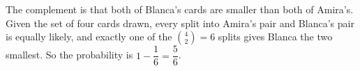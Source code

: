 The complement is that both of Blanca's cards are smaller than both of Amira's. Given the set of four cards drawn, every split into Amira's pair and Blanca's pair is equally likely, and exactly one of the $\binom42=6$ splits gives Blanca the two smallest. So the probability is $1-\dfrac16=\boxed{\dfrac56}$.

